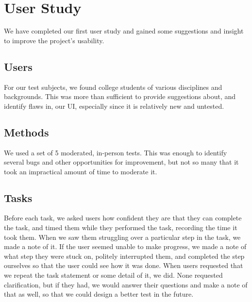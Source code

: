 \documentclass[letterpaper,10pt, onecolumn, draftclsnofoot]{IEEEtran}
\begin{document}


\section{User Study}

We have completed our first user study and gained some suggestions and insight to improve the project's usability. 

\subsection{Users}

For our test subjects, we found college students of various disciplines and backgrounds. This was more than sufficient to provide suggestions about, and identify flaws in, our UI, especially since it is relatively new and untested.

\subsection{Methods}

We used a set of 5 moderated, in-person tests. This was enough to identify several bugs and other opportunities for improvement, but not so many that it took an impractical amount of time to moderate it.

\subsection{Tasks}

Before each task, we asked users how confident they are that they can complete the task, and timed them while they performed the task, recording the time it took them. When we saw them struggling over a particular step in the task, we made a note of it. If the user seemed unable to make progress, we made a note of what step they were stuck on, politely interrupted them, and completed the step ourselves so that the user could see how it was done. When users requested that we repeat the task statement or some detail of it, we did. None requested clarification, but if they had, we would answer their questions and make a note of that as well, so that we could design a better test in the future.
\end{document}
